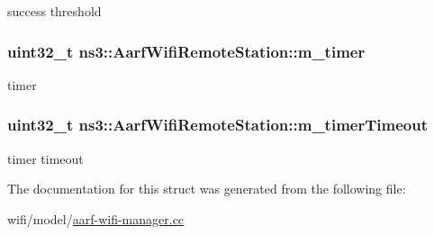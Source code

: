 success threshold 

\subsubsection[{\texorpdfstring{m\+\_\+timer}{m_timer}}]{\setlength{\rightskip}{0pt plus 5cm}uint32\+\_\+t ns3\+::\+Aarf\+Wifi\+Remote\+Station\+::m\+\_\+timer}\hypertarget{structns3_1_1AarfWifiRemoteStation_a4c0ee414a7238d8ae64513534300ba5a}{}\label{structns3_1_1AarfWifiRemoteStation_a4c0ee414a7238d8ae64513534300ba5a}


timer 

\subsubsection[{\texorpdfstring{m\+\_\+timer\+Timeout}{m_timerTimeout}}]{\setlength{\rightskip}{0pt plus 5cm}uint32\+\_\+t ns3\+::\+Aarf\+Wifi\+Remote\+Station\+::m\+\_\+timer\+Timeout}\hypertarget{structns3_1_1AarfWifiRemoteStation_a9443b93f52a3894b4f801d60df68fe39}{}\label{structns3_1_1AarfWifiRemoteStation_a9443b93f52a3894b4f801d60df68fe39}


timer timeout 



The documentation for this struct was generated from the following file\+:\begin{DoxyCompactItemize}
\item 
wifi/model/\hyperlink{aarf-wifi-manager_8cc}{aarf-\/wifi-\/manager.\+cc}\end{DoxyCompactItemize}
